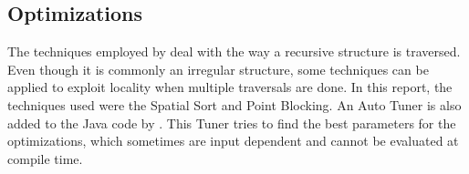 \subsection{Optimizations}
\label{sec:optim}

The techniques employed by \treetiler deal with the way a recursive structure is traversed. Even though it is commonly an irregular structure, some techniques can be applied to exploit locality when multiple traversals are done. In this report, the techniques used were the Spatial Sort and Point Blocking. An Auto Tuner is also added to the Java code by \treetiler. This Tuner tries to find the best parameters for the optimizations, which sometimes are input dependent and cannot be evaluated at compile time.




